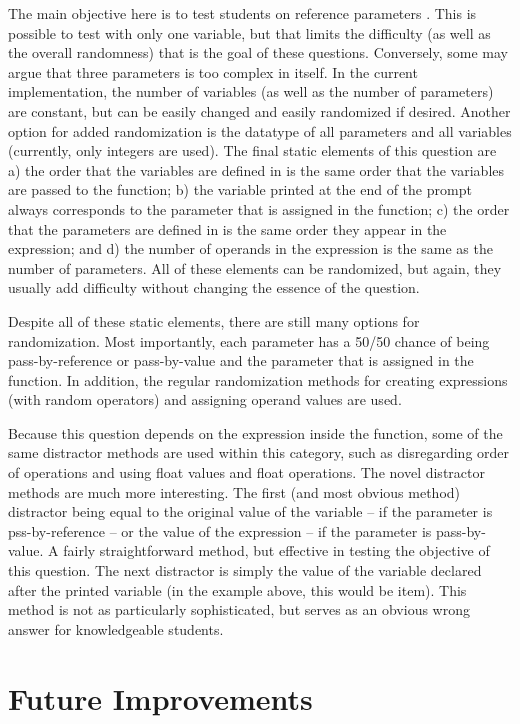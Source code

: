 \documentclass{article}
\begin{document}
The main objective here is to test students on reference parameters . This is possible to test with only one variable, but that limits the difficulty (as well as the overall randomness) that is the goal of these questions. Conversely, some may argue that three parameters is too complex in itself. In the current implementation, the number of variables (as well as the number of parameters) are constant, but can be easily changed and easily randomized if desired. Another option for added randomization is the datatype of all parameters and all variables (currently, only integers are used). The final static elements of this question are a) the order that the variables are defined in is the same order that the variables are passed to the function; b) the variable printed at the end of the prompt always corresponds to the parameter that is assigned in the function; c) the order that the parameters are defined in is the same order they appear in the expression; and d) the number of operands in the expression is the same as the number of parameters. All of these elements can be randomized, but again, they usually add difficulty without changing the essence of the question. 

Despite all of these static elements, there are still many options for randomization.  Most importantly, each parameter has a 50/50 chance of being pass-by-reference or pass-by-value and the parameter that is assigned in the function. In addition, the regular randomization methods for creating expressions (with random operators) and assigning operand values are used.

Because this question depends on the expression inside the function, some of the same distractor methods are used within this category, such as disregarding order of operations and
using float values and float operations. The novel distractor methods are much more interesting.
The first (and most obvious method) distractor being equal to the original value of the variable -- if the parameter is pss-by-reference -- or the value of the expression -- if the parameter is pass-by-value. A fairly straightforward method, but effective in testing the objective of this question. 
The next distractor is simply the value of the variable declared after the printed variable (in the example above, this would be item). This method is not as particularly sophisticated, but serves as an obvious wrong answer for knowledgeable students. 

\section{Future Improvements}
\end{document}
